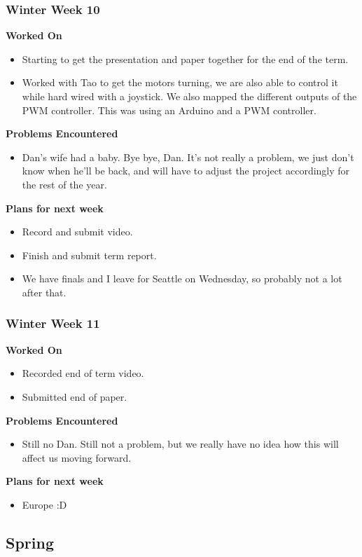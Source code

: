 \documentclass[compsoc,draftclsnofoot,onecolumn,10pt]{IEEEtran}
\begin{document}
\subsubsection*{Winter Week 10}
\textbf{Worked On}
\begin{itemize}
    \item Starting to get the presentation and paper together for the end of the term. 
    \item Worked with Tao to get the motors turning, we are also able to control it while hard wired with a joystick. We also mapped the different outputs of the PWM controller. This was using an Arduino and a PWM controller.
\end{itemize}
\textbf{Problems Encountered}
\begin{itemize}
    \item Dan's wife had a baby. Bye bye, Dan. It's not really a problem, we just don't know when he'll be back, and will have to adjust the project accordingly for the rest of the year. 
\end{itemize}
\textbf{Plans for next week}
\begin{itemize}
    \item Record and submit video.
    \item Finish and submit term report.
    \item We have finals and I leave for Seattle on Wednesday, so probably not a lot after that.
\end{itemize}


\subsubsection*{Winter Week 11}
\textbf{Worked On}
\begin{itemize}
    \item Recorded end of term video.
    \item Submitted end of paper. 
\end{itemize}
\textbf{Problems Encountered}
\begin{itemize}
    \item Still no Dan. Still not a problem, but we really have no idea how this will affect us moving forward. 
\end{itemize}
\textbf{Plans for next week}
\begin{itemize}
    \item Europe :D
\end{itemize}


\subsection{Spring}
\end{document}
